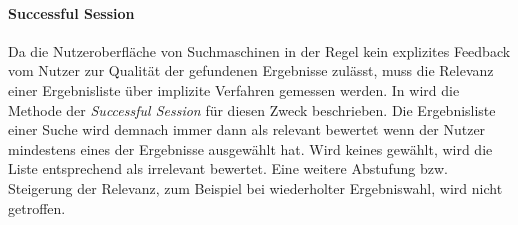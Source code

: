 \paragraph{Successful Session} Da die Nutzeroberfläche von Suchmaschinen in der Regel kein explizites Feedback vom Nutzer zur Qualität der gefundenen Ergebnisse  zulässt, muss die Relevanz einer Ergebnisliste über implizite Verfahren gemessen werden. In \citep{smyth05a} wird die Methode der \textit{Successful Session} für diesen Zweck beschrieben. Die Ergebnisliste einer Suche wird demnach immer dann als relevant bewertet wenn der Nutzer mindestens eines der Ergebnisse ausgewählt hat. Wird keines gewählt, wird die Liste entsprechend als irrelevant bewertet. Eine weitere Abstufung bzw. Steigerung der Relevanz, zum Beispiel bei wiederholter Ergebniswahl, wird nicht getroffen. \citep{smyth05a}

